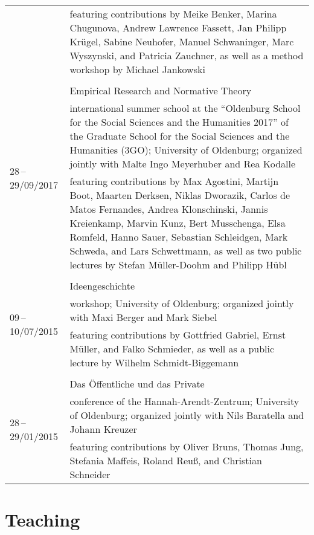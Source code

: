 \documentclass[a4paper,10pt]{article}
\begin{document}
\begin{longtable}{p{2.25cm}p{11cm}}
& \footnotesize{featuring contributions by Meike Benker, Marina Chugunova, Andrew Lawrence Fassett, Jan Philipp Krügel, Sabine Neuhofer, Manuel Schwaninger, Marc Wyszynski, and Patricia Zauchner, as well as a method workshop by Michael Jankowski}\\
\\
\multirow{3}{2.25cm}{\footnotesize{28\,--\,29/09/2017}} & Empirical Research and Normative Theory\\
& \footnotesize{international summer school at the \enquote{Oldenburg School for the Social Sciences and the Humanities 2017} of the Graduate School for the Social Sciences and the Humanities (3GO); University of Oldenburg; organized jointly with Malte Ingo Meyerhuber and Rea Kodalle}\\
& \footnotesize{featuring contributions by Max Agostini, Martijn Boot, Maarten Derksen, Niklas Dworazik, Carlos de Matos Fernandes, Andrea Klonschinski, Jannis Kreienkamp, Marvin Kunz, Bert Musschenga, Elsa Romfeld, Hanno Sauer, Sebastian Schleidgen, Mark Schweda, and Lars Schwettmann, as well as two public lectures by Stefan Müller-Doohm and Philipp Hübl}\\
\\
\multirow{3}{2.25cm}{\footnotesize{09\,--\,10/07/2015}} & Ideengeschichte\\
& \footnotesize{workshop; University of Oldenburg; organized jointly with Maxi Berger and Mark Siebel}\\
& \footnotesize{featuring contributions by Gottfried Gabriel, Ernst Müller, and Falko Schmieder, as well as a public lecture by Wilhelm Schmidt-Biggemann}\\
\\
\multirow{3}{2.25cm}{\footnotesize{28\,--\,29/01/2015}} & Das Öffentliche und das Private\\
& \footnotesize{conference of the Hannah-Arendt-Zentrum; University of Oldenburg; organized jointly with Nils Baratella and Johann Kreuzer}\\
& \footnotesize{featuring contributions by Oliver Bruns, Thomas Jung, Stefania Maffeis, Roland Reuß, and Christian Schneider}\\
\end{longtable}


\clearpage
\section{Teaching}
\end{document}

